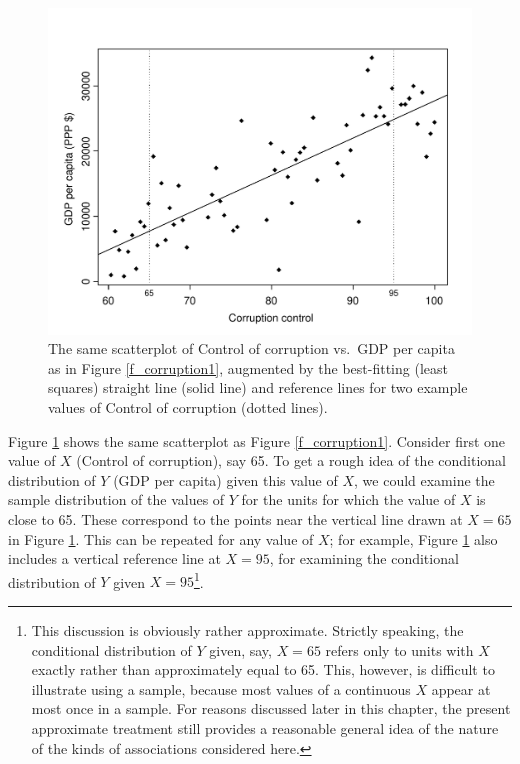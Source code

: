 \begin{figure}[t]
\caption{
The same scatterplot of Control of corruption vs.\ GDP per capita as in
Figure \ref{f_corruption1}, augmented by the best-fitting (least
squares) straight line (solid line) and reference lines
for two example values of Control of corruption (dotted lines).}
\label{f_corruption2}

\includegraphics[width=13.5cm]{corruption2}

\end{figure}

Figure \ref{f_corruption2} shows the same scatterplot as Figure
\ref{f_corruption1}. Consider first one value of $X$ (Control of
corruption), say 65. To get a rough idea of the conditional distribution
of $Y$ (GDP per capita) given this value of $X$, we could examine the
sample distribution of the values of $Y$ for the units for which the
value of $X$ is close to 65. These correspond to the points near the
vertical line drawn at $X=65$ in Figure \ref{f_corruption2}. This can
be repeated for any value of $X$; for example, Figure
\ref{f_corruption2} also includes a vertical reference line at $X=95$,
for examining the conditional distribution of $Y$ given
$X=95$\footnote{This discussion is obviously rather approximate.
Strictly speaking, the conditional distribution of $Y$ given, say,
$X=65$ refers only to units with $X$ exactly rather than approximately
equal to 65. This, however, is difficult to illustrate using a sample,
because most values of a continuous $X$ appear at most once in a sample.
For reasons discussed later in this chapter, the present approximate
treatment still provides a reasonable general idea of the nature of the
kinds of associations considered here.}.

